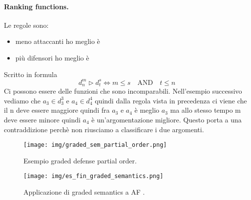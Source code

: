 \paragraph{Ranking functions.} Le regole sono:
\begin{itemize}
    \item meno attaccanti ho meglio è
    \item più difensori ho meglio è
\end{itemize}
Scritto in formula 
\[d_n^m \triangleright  d_t^s \iff m \leq s \quad \text{AND} \quad t \leq n\]
Ci possono essere delle funzioni che sono incomparabili. Nell'esempio successivo vediamo che $a_3 \in d_3^3$ e $a_4 \in d_4^4$ quindi dalla regola vista in precedenza ci viene che il n deve essere maggiore quindi fra $a_3$ e $a_4$ è meglio $a_3$ ma allo stesso tempo m deve essere minore quindi $a_4$ è un'argomentazione migliore. Questo porta a una contraddizione perchè non riusciamo a classificare i due argomenti. 
\begin{figure}[H]
    \centering
    \texttt{[image: img/graded\_sem\_partial\_order.png]}
    \caption{Esempio graded defense partial order.}\label{fig:es_graded_defense_partial order}
\end{figure}

\begin{figure}[H]
    \centering
    \texttt{[image: img/es\_fin\_graded\_semantics.png]}
    \caption{Applicazione di graded semantics a AF .}\label{fig:es_fin_graded_semantics}
\end{figure}